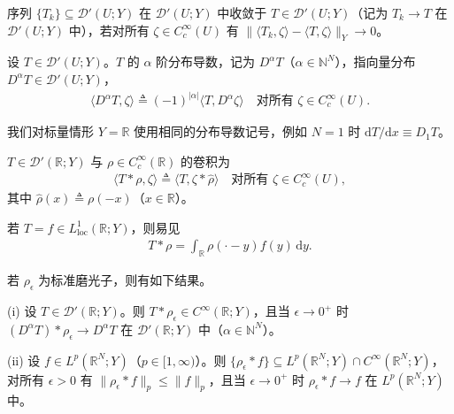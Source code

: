 \documentclass[../../main.tex]{subfiles}%
\begin{document}
\begin{definition}\label{definition:ch04-分布收敛}
序列 $\{T_k\}\subseteq\mathcal{D}'(U;Y)$ 在 $\mathcal{D}'(U;Y)$ 中收敛于 $T\in\mathcal{D}'(U;Y)$（记为 $T_k\to T$ 在 $\mathcal{D}'(U;Y)$ 中），若对所有 $\zeta\in C_c^\infty(U)$ 有 $\|\langle T_k,\zeta\rangle-\langle T,\zeta\rangle\|_Y\to0$。
\end{definition}

\begin{definition}\label{definition:ch04-分布导数}
设 $T\in\mathcal{D}'(U;Y)$。$T$ 的 $\alpha$ 阶分布导数，记为 $D^\alpha T$（$\alpha\in\mathbb{N}^N$），指向量分布 $D^\alpha T\in\mathcal{D}'(U;Y)$，
\begin{align*}
\langle D^\alpha T,\zeta\rangle\triangleq (-1)^{|\alpha|}\langle T,D^\alpha\zeta\rangle\quad\text{对所有 }\zeta\in C_c^\infty(U).
\end{align*}
\end{definition}

我们对标量情形 $Y=\mathbb{R}$ 使用相同的分布导数记号，例如 $N=1$ 时 $\mathrm{d}T/\mathrm{d}x\equiv D_1T$。

\begin{definition}\label{definition:ch04-分布卷积}
$T\in\mathcal{D}'(\mathbb{R};Y)$ 与 $\rho\in C_c^\infty(\mathbb{R})$ 的卷积为
\begin{align*}
\langle T*\rho,\zeta\rangle\triangleq \langle T,\zeta*\hat\rho\rangle\quad\text{对所有 }\zeta\in C_c^\infty(U),
\end{align*}
其中 $\hat\rho(x)\triangleq \rho(-x)$（$x\in\mathbb{R}$）。

若 $T=f\in L^1_{\mathrm{loc}}(\mathbb{R};Y)$，则易见
\begin{align*}
T*\rho=\int_{\mathbb{R}}\rho(\cdot-y)f(y)\,\mathrm{d}y.
\end{align*}
\end{definition}

若 $\rho_\epsilon$ 为标准磨光子，则有如下结果。

\begin{proposition}\label{proposition:ch04-磨光逼近}
(i) 设 $T\in\mathcal{D}'(\mathbb{R};Y)$。则 $T*\rho_\epsilon\in C^\infty(\mathbb{R};Y)$，且当 $\epsilon\to0^+$ 时 $(D^\alpha T)*\rho_\epsilon\to D^\alpha T$ 在 $\mathcal{D}'(\mathbb{R};Y)$ 中（$\alpha\in\mathbb{N}^N$）。

(ii) 设 $f\in L^p(\mathbb{R}^N;Y)$（$p\in[1,\infty)$）。则 $\{\rho_\epsilon*f\}\subseteq L^p(\mathbb{R}^N;Y)\cap C^\infty(\mathbb{R}^N;Y)$，对所有 $\epsilon>0$ 有 $\|\rho_\epsilon*f\|_p\leqslant\|f\|_p$，且当 $\epsilon\to0^+$ 时 $\rho_\epsilon*f\to f$ 在 $L^p(\mathbb{R}^N;Y)$ 中。
\end{proposition}
\end{document}
